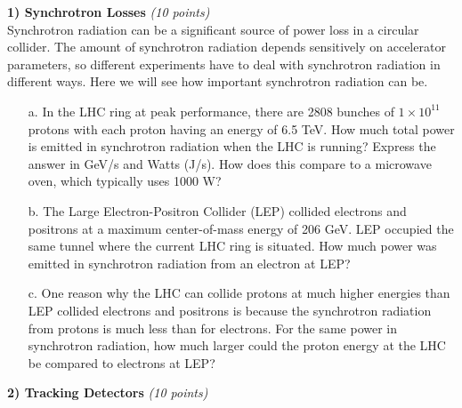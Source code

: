 {\large

\textbf{1) Synchrotron Losses } \hfill \textit{(10 points)}\\

Synchrotron radiation can be a significant source of power loss in a circular collider. The amount of synchrotron radiation depends sensitively on accelerator parameters, so different experiments have to deal with synchrotron radiation in different ways. Here we will see how important synchrotron radiation can be.
\begin{itemize}
\item[a.]{ In the LHC ring at peak performance, there are 2808 bunches of $1 \times 10^{11}$ protons with each proton having an energy of 6.5 TeV. 
How much total power is emitted in synchrotron radiation when the LHC is running? Express the answer in GeV/s and Watts (J/s). How does this compare to a microwave oven, which typically uses 1000 W?}
\item[b.]{The Large Electron-Positron Collider (LEP) collided electrons and positrons at a maximum center-of-mass energy of 206 GeV. LEP occupied the same tunnel where the current LHC ring is situated. How much power was emitted in synchrotron radiation from an electron at LEP?}
\item[c.]{One reason why the LHC can collide protons at much higher energies than LEP collided electrons and positrons is because the synchrotron radiation from protons is much less than for electrons. For the same power in synchrotron radiation, how much larger could the proton energy at the LHC be compared to electrons at LEP?}
\end{itemize}

\vspace*{0.25in}

\textbf{2) Tracking Detectors } \hfill \textit{(10 points)}\\

}
